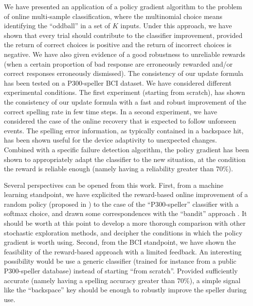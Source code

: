 \documentclass[conference]{IEEEtran}
\begin{document}
We have presented an application of a policy gradient algorithm 
to the problem of online multi-sample classification, where the multinomial choice means identifying 
the ``oddball'' in a set of $K$ inputs. 
Under this approach, we have shown that every trial should contribute to the classifier improvement, 
provided the return of correct choices is positive and the return of incorrect choices is negative.
We have also given evidence of a good robustness to unreliable rewards 
(when a certain proportion of bad response are erroneously rewarded and/or correct responses 
erroneously dismissed). 
The consistency of our update formula 
has been tested on a P300-speller BCI dataset.
We have considered different experimental conditions. The first experiment (starting from scratch),
has shown the consistency of our update formula with a fast and robust improvement of the 
correct spelling rate in few time steps.
In a second experiment, we have considered the case of the online recovery that is expected to follow 
unforseen events. 
The spelling error information, as typically contained in a backspace hit, has been shown useful for the device adaptivity to unexpected changes. 
Combined with a specific failure detection algorithm, the policy gradient has been shown to appropriately
adapt the classifier to the new situation, at the condition 
the reward is reliable enough (namely having a reliability greater than 70\%).


Several perspectives can be opened from this work. First, from a machine learning standpoint, we have
explicited the reward-based online improvement of a random policy (proposed in \cite{Wil92}) to the case of the ``P300-speller'' classifier
with a softmax choice, and drawn 
some correspondences with the ``bandit'' approach \cite{Auer02}. It should be worth at this point to develop a
more thorough comparison with other stochastic exploration methods, and decipher the conditions in which the policy gradient 
is worth using. 
Second, from the BCI standpoint, we have shown the feasibility 
of the reward-based approach with a limited feedback.
An interesting possibility would be use a generic classifier (trained for instance from a public P300-speller database) instead of starting
``from scratch''. Provided sufficiently accurate (namely having a spelling accuracy greater than 70\%), a
simple signal like the ``backspace'' key should be enough to robustly improve the speller during use.  
\end{document}
